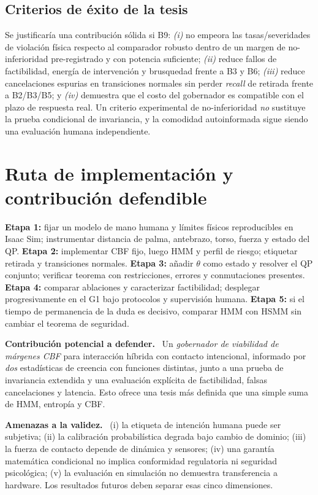 \documentclass[10pt,a4paper,twocolumn]{article}
\newcommand{\subttl}[1]{\vspace{3pt}\noindent\textbf{\color{ink}#1.}~}
\begin{document}
\subsection{Criterios de éxito de la tesis}
Se justificaría una contribución sólida si B9: \emph{(i)} no empeora las tasas/severidades de violación física respecto al comparador robusto dentro de un margen de no-inferioridad pre-registrado y con potencia suficiente; \emph{(ii)} reduce fallos de factibilidad, energía de intervención y brusquedad frente a B3 y B6; \emph{(iii)} reduce cancelaciones espurias en transiciones normales sin perder \emph{recall} de retirada frente a B2/B3/B5; y \emph{(iv)} demuestra que el costo del gobernador es compatible con el plazo de respuesta real. Un criterio experimental de no-inferioridad \emph{no} sustituye la prueba condicional de invariancia, y la comodidad autoinformada sigue siendo una evaluación humana independiente.


\section{Ruta de implementación y contribución defendible}
\textbf{Etapa 1:} fijar un modelo de mano humana y límites físicos reproducibles en Isaac Sim; instrumentar distancia de palma, antebrazo, torso, fuerza y estado del QP. \textbf{Etapa 2:} implementar CBF fijo, luego HMM y perfil de riesgo; etiquetar retirada y transiciones normales. \textbf{Etapa 3:} añadir $\theta$ como estado y resolver el QP conjunto; verificar teorema con restricciones, errores y conmutaciones presentes. \textbf{Etapa 4:} comparar ablaciones y caracterizar factibilidad; desplegar progresivamente en el G1 bajo protocolos y supervisión humana. \textbf{Etapa 5:} si el tiempo de permanencia de la duda es decisivo, comparar HMM con HSMM sin cambiar el teorema de seguridad.

\subttl{Contribución potencial a defender} Un \emph{gobernador de viabilidad de márgenes CBF} para interacción híbrida con contacto intencional, informado por \emph{dos} estadísticas de creencia con funciones distintas, junto a una prueba de invariancia extendida y una evaluación explícita de factibilidad, falsas cancelaciones y latencia. Esto ofrece una tesis más definida que una simple suma de HMM, entropía y CBF.

\subttl{Amenazas a la validez} (i) la etiqueta de intención humana puede ser subjetiva; (ii) la calibración probabilística degrada bajo cambio de dominio; (iii) la fuerza de contacto depende de dinámica y sensores; (iv) una garantía matemática condicional no implica conformidad regulatoria ni seguridad psicológica; (v) la evaluación en simulación no demuestra transferencia a hardware. Los resultados futuros deben separar esas cinco dimensiones.
\end{document}
